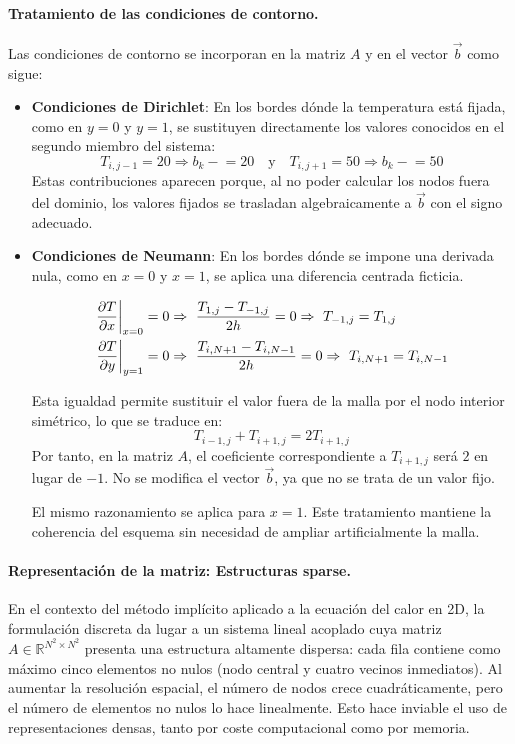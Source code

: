 \documentclass{article}
\begin{document}
\paragraph{Tratamiento de las condiciones de contorno.} Las condiciones de contorno se incorporan en la matriz \( A \) y en el vector \( \vec{b} \) como sigue:
\begin{itemize}
    \item \textbf{Condiciones de Dirichlet}: En los bordes dónde la temperatura está fijada, como en \( y = 0 \) y \( y = 1 \), se sustituyen directamente los valores conocidos en el segundo miembro del sistema:
    $$
    T_{i,j-1} = 20 \Rightarrow b_k \mathrel{-}= 20
    \quad \text{y} \quad
    T_{i,j+1} = 50 \Rightarrow b_k \mathrel{-}= 50
    $$
    Estas contribuciones aparecen porque, al no poder calcular los nodos fuera del dominio, los valores fijados se trasladan algebraicamente a \( \vec{b} \) con el signo adecuado.

    \item \textbf{Condiciones de Neumann}: En los bordes dónde se impone una derivada nula, como en \( x = 0 \) y \( x = 1 \), se aplica una diferencia centrada ficticia.
    
    \begin{align}
    \left. \frac{\partial T}{\partial x} \right|_{x=0} = 0 
    &\Rightarrow\ \frac{T_{1,j} - T_{-1,j}}{2h} = 0 
    \Rightarrow\ T_{-1,j} = T_{1,j} \notag \\
    \left. \frac{\partial T}{\partial y} \right|_{y=1} = 0 
    &\Rightarrow\ \frac{T_{i,N+1} - T_{i,N-1}}{2h} = 0 
    \Rightarrow\ T_{i,N+1} = T_{i,N-1} \notag
    \end{align}
    
    Esta igualdad permite sustituir el valor fuera de la malla por el nodo interior simétrico, lo que se traduce en:
    $$
    T_{i-1,j} + T_{i+1,j} = 2T_{i+1,j}
    $$
    Por tanto, en la matriz \( A \), el coeficiente correspondiente a \( T_{i+1,j} \) será \(2\) en lugar de \(-1\). No se modifica el vector \( \vec{b} \), ya que no se trata de un valor fijo.
    
    El mismo razonamiento se aplica para \( x = 1 \). Este tratamiento mantiene la coherencia del esquema sin necesidad de ampliar artificialmente la malla.

\end{itemize}

\paragraph{Representación de la matriz: Estructuras sparse.} En el contexto del método implícito aplicado a la ecuación del calor en 2D, la formulación discreta da lugar a un sistema lineal acoplado cuya matriz $A \in \mathbb{R}^{N^2 \times N^2}$ presenta una estructura altamente dispersa: cada fila contiene como máximo cinco elementos no nulos (nodo central y cuatro vecinos inmediatos). Al aumentar la resolución espacial, el número de nodos crece cuadráticamente, pero el número de elementos no nulos lo hace linealmente. Esto hace inviable el uso de representaciones densas, tanto por coste computacional como por memoria.\\
\end{document}
